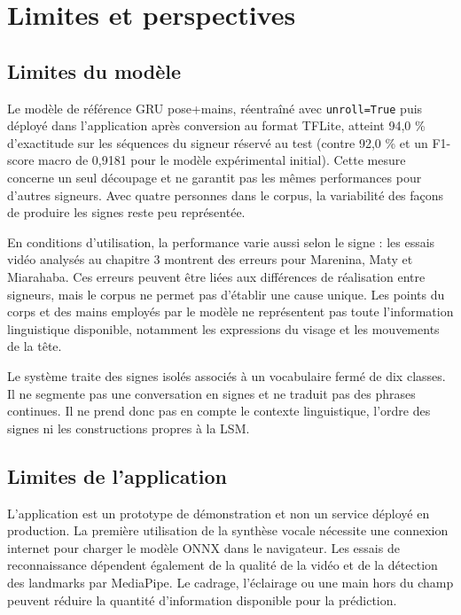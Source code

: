 \chapter{Limites et perspectives}

\section{Limites du modèle}

Le modèle de référence GRU pose+mains, réentraîné avec \texttt{unroll=True} puis déployé dans l'application après conversion au format TFLite, atteint 94,0 \% d'exactitude sur les séquences du signeur réservé au test (contre 92,0 \% et un F1-score macro de 0,9181 pour le modèle expérimental initial). Cette mesure concerne un seul découpage et ne garantit pas les mêmes performances pour d'autres signeurs. Avec quatre personnes dans le corpus, la variabilité des façons de produire les signes reste peu représentée.

En conditions d'utilisation, la performance varie aussi selon le signe : les essais vidéo analysés au chapitre 3 montrent des erreurs pour Marenina, Maty et Miarahaba. Ces erreurs peuvent être liées aux différences de réalisation entre signeurs, mais le corpus ne permet pas d'établir une cause unique. Les points du corps et des mains employés par le modèle ne représentent pas toute l'information linguistique disponible, notamment les expressions du visage et les mouvements de la tête.

Le système traite des signes isolés associés à un vocabulaire fermé de dix classes. Il ne segmente pas une conversation en signes et ne traduit pas des phrases continues. Il ne prend donc pas en compte le contexte linguistique, l'ordre des signes ni les constructions propres à la LSM.

\section{Limites de l'application}

L'application est un prototype de démonstration et non un service déployé en production. La première utilisation de la synthèse vocale nécessite une connexion internet pour charger le modèle ONNX dans le navigateur. Les essais de reconnaissance dépendent également de la qualité de la vidéo et de la détection des landmarks par MediaPipe. Le cadrage, l'éclairage ou une main hors du champ peuvent réduire la quantité d'information disponible pour la prédiction.

